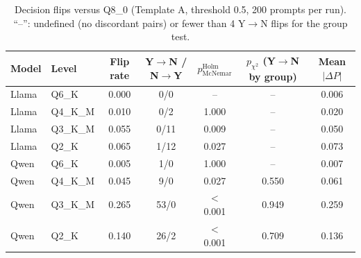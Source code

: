 \begin{table}[t]
\centering\footnotesize\setlength{\tabcolsep}{3pt}
\caption{Decision flips versus Q8\_0 (Template A, threshold 0.5, 200 prompts per run). ``--'': undefined (no discordant pairs) or fewer than 4 Y$\to$N flips for the group test.}\label{tab:flips}
\begin{tabular}{llccccc}
\toprule
Model & Level & Flip rate & Y$\to$N / N$\to$Y & $p_{\mathrm{McNemar}}^{\mathrm{Holm}}$ & $p_{\chi^2}$ (Y$\to$N by group) & Mean $|\Delta P|$ \\
\midrule
Llama & Q6\_K & 0.000 & 0/0 & -- & -- & 0.006 \\
Llama & Q4\_K\_M & 0.010 & 0/2 & 1.000 & -- & 0.020 \\
Llama & Q3\_K\_M & 0.055 & 0/11 & 0.009 & -- & 0.050 \\
Llama & Q2\_K & 0.065 & 1/12 & 0.027 & -- & 0.073 \\
Qwen & Q6\_K & 0.005 & 1/0 & 1.000 & -- & 0.007 \\
Qwen & Q4\_K\_M & 0.045 & 9/0 & 0.027 & 0.550 & 0.061 \\
Qwen & Q3\_K\_M & 0.265 & 53/0 & $<$0.001 & 0.949 & 0.259 \\
Qwen & Q2\_K & 0.140 & 26/2 & $<$0.001 & 0.709 & 0.136 \\
\bottomrule
\end{tabular}
\end{table}
